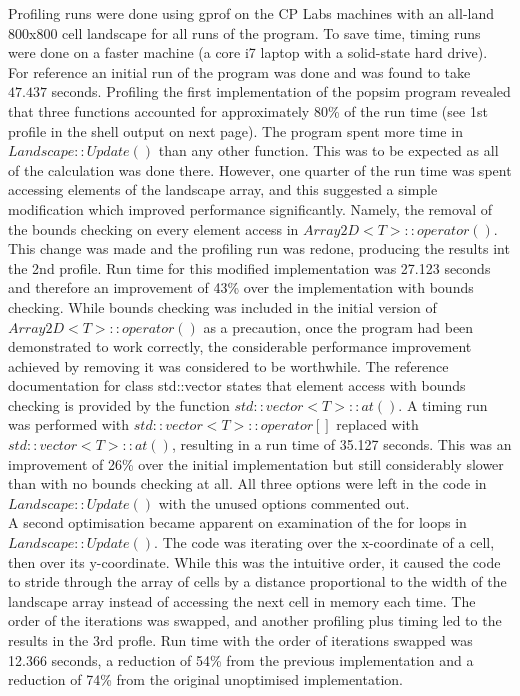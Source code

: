 \documentclass[12pt,a4paper]{article}
\begin{document}
Profiling runs were done using gprof on the CP Labs machines with an all-land 800x800 cell landscape for all runs of the program. To save time, timing runs were done on a faster machine (a core i7 laptop with a solid-state hard drive). 
For reference an initial run of the program was done and was found to take $47.437$ seconds.  Profiling the first implementation of the popsim program revealed that three functions accounted for approximately 80\% of the run time (see 1st profile in the shell output on next page).
The program spent more time in $Landscape::Update()$ than any other function. This was to be expected as all of the calculation was done there. However, one quarter of the run time was spent accessing elements of the landscape array, and this suggested a simple modification which improved performance significantly.
Namely, the removal of the bounds checking on every element access in $Array2D<T>::operator()$. This change was made and the profiling run was redone, producing the results int the 2nd profile.
Run time for this modified implementation was 27.123 seconds and therefore an improvement of 43\% over the implementation with bounds checking.
While bounds checking was included in the initial version of $Array2D<T>::operator()$ as a precaution, once the program had been demonstrated to work correctly, the considerable performance improvement achieved by removing it was considered to be worthwhile.
The reference documentation for class std::vector states that element access with bounds checking is provided by the function $std::vector<T>::at()$.  A timing run was performed with $std::vector<T>::operator[]$ replaced with $std::vector<T>::at()$, resulting in a run time of 35.127 seconds.
This was an improvement of 26\% over the initial implementation but still considerably slower than with no bounds checking at all.
All three options were left in the code in $Landscape::Update()$ with the unused options commented out.\\

A second optimisation became apparent on examination of the for loops in $Landscape::Update()$. The code was iterating over the x-coordinate of a cell, then over its y-coordinate.
While this was the intuitive order, it caused the code to stride through the array of cells by a distance proportional to the width of the landscape array instead of accessing the next cell in memory each time.
The order of the iterations was swapped, and another profiling plus timing led to the results in the 3rd profle. Run time with the order of iterations swapped was 12.366 seconds, a reduction of 54\% from the previous implementation and a reduction of 74\% from the original unoptimised implementation.\\
\end{document}
